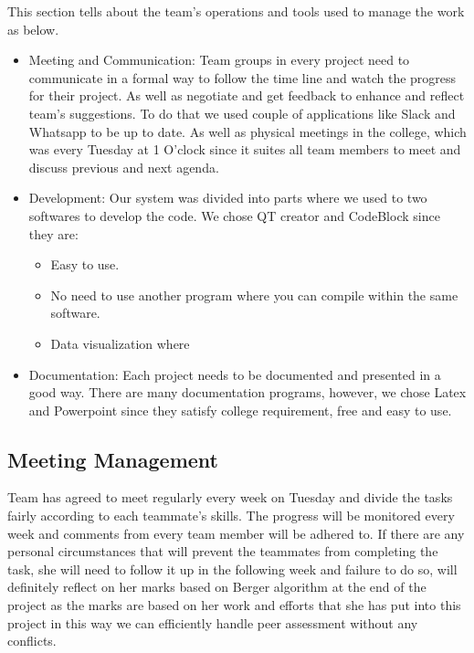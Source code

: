 \documentclass{article}
\begin{document}
This section tells about the team's operations and tools used to manage the work as below.   
\begin{itemize}

\item Meeting and Communication: Team groups in every project need to communicate in a formal way to follow the time line and watch the progress for their project. As well as negotiate and get feedback to enhance and reflect team’s suggestions. To do that we used couple of applications like Slack and Whatsapp to be up to date. As well as physical meetings in the college, which was every Tuesday at 1 O’clock since it suites all team members to meet and discuss previous and next agenda. 
\item Development: Our system was divided into parts where we used to two softwares to develop the code. We chose QT creator and CodeBlock since they are:
\begin{itemize}
\item 	Easy to use.
\item	No need to use another program where you can compile within the same software.
\item Data visualization where 

\end{itemize}
\item Documentation: Each project needs to be documented and presented in a good way. There are many documentation programs, however, we chose Latex and Powerpoint since they satisfy college requirement, free and easy to use. 

\end{itemize}



\subsection{Meeting Management} 
Team has agreed to meet regularly every week on Tuesday and divide the tasks fairly according to each teammate's skills. The progress will be monitored every week and comments from every team member will be adhered to. \newline If there are any personal circumstances that will prevent the teammates from completing the task, she will need to follow it up in the following week and failure to do so, will definitely reflect on her marks based on Berger algorithm at the end of the project as the marks are based on her work and efforts that she has put into this project in this way we can efficiently handle peer assessment without any conflicts. 
\end{document}
